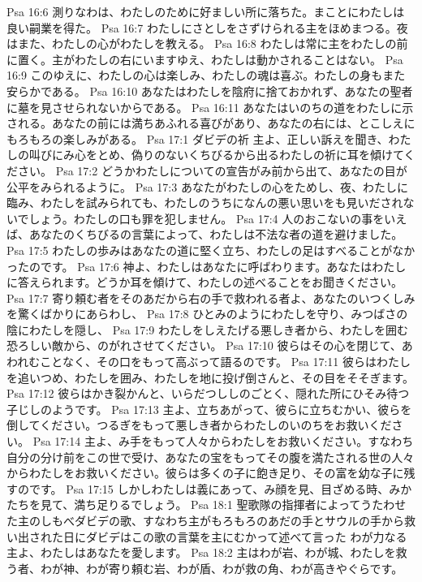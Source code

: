 Psa 16:6  測りなわは、わたしのために好ましい所に落ちた。まことにわたしは良い嗣業を得た。
Psa 16:7  わたしにさとしをさずけられる主をほめまつる。夜はまた、わたしの心がわたしを教える。
Psa 16:8  わたしは常に主をわたしの前に置く。主がわたしの右にいますゆえ、わたしは動かされることはない。
Psa 16:9  このゆえに、わたしの心は楽しみ、わたしの魂は喜ぶ。わたしの身もまた安らかである。
Psa 16:10  あなたはわたしを陰府に捨ておかれず、あなたの聖者に墓を見させられないからである。
Psa 16:11  あなたはいのちの道をわたしに示される。あなたの前には満ちあふれる喜びがあり、あなたの右には、とこしえにもろもろの楽しみがある。
Psa 17:1  ダビデの祈 主よ、正しい訴えを聞き、わたしの叫びにみ心をとめ、偽りのないくちびるから出るわたしの祈に耳を傾けてください。
Psa 17:2  どうかわたしについての宣告がみ前から出て、あなたの目が公平をみられるように。
Psa 17:3  あなたがわたしの心をためし、夜、わたしに臨み、わたしを試みられても、わたしのうちになんの悪い思いをも見いだされないでしょう。わたしの口も罪を犯しません。
Psa 17:4  人のおこないの事をいえば、あなたのくちびるの言葉によって、わたしは不法な者の道を避けました。
Psa 17:5  わたしの歩みはあなたの道に堅く立ち、わたしの足はすべることがなかったのです。
Psa 17:6  神よ、わたしはあなたに呼ばわります。あなたはわたしに答えられます。どうか耳を傾けて、わたしの述べることをお聞きください。
Psa 17:7  寄り頼む者をそのあだから右の手で救われる者よ、あなたのいつくしみを驚くばかりにあらわし、
Psa 17:8  ひとみのようにわたしを守り、みつばさの陰にわたしを隠し、
Psa 17:9  わたしをしえたげる悪しき者から、わたしを囲む恐ろしい敵から、のがれさせてください。
Psa 17:10  彼らはその心を閉じて、あわれむことなく、その口をもって高ぶって語るのです。
Psa 17:11  彼らはわたしを追いつめ、わたしを囲み、わたしを地に投げ倒さんと、その目をそそぎます。
Psa 17:12  彼らはかき裂かんと、いらだつししのごとく、隠れた所にひそみ待つ子じしのようです。
Psa 17:13  主よ、立ちあがって、彼らに立ちむかい、彼らを倒してください。つるぎをもって悪しき者からわたしのいのちをお救いください。
Psa 17:14  主よ、み手をもって人々からわたしをお救いください。すなわち自分の分け前をこの世で受け、あなたの宝をもってその腹を満たされる世の人々からわたしをお救いください。彼らは多くの子に飽き足り、その富を幼な子に残すのです。
Psa 17:15  しかしわたしは義にあって、み顔を見、目ざめる時、みかたちを見て、満ち足りるでしょう。
Psa 18:1  聖歌隊の指揮者によってうたわせた主のしもべダビデの歌、すなわち主がもろもろのあだの手とサウルの手から救い出された日にダビデはこの歌の言葉を主にむかって述べて言った わが力なる主よ、わたしはあなたを愛します。
Psa 18:2  主はわが岩、わが城、わたしを救う者、わが神、わが寄り頼む岩、わが盾、わが救の角、わが高きやぐらです。
